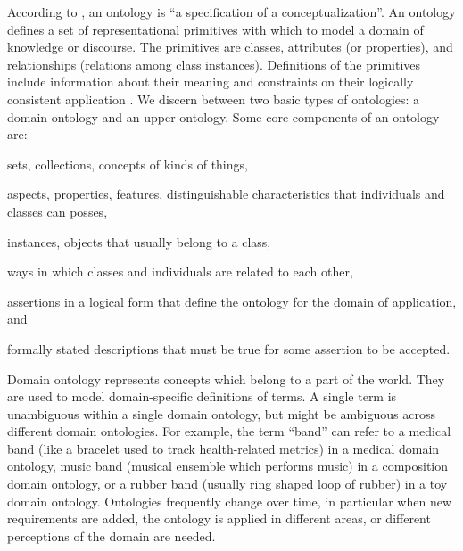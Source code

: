 According to \citep{gruber2009ontology}, 
an ontology is ``a specification of a conceptualization''.
An ontology defines a set of representational primitives with which to model 
a domain of knowledge or discourse. The primitives are classes, attributes
(or properties), and relationships (relations among class instances). 
Definitions of the primitives include information about their
meaning and constraints on their logically consistent application
\citep{gruber2009ontology}.
We discern between two basic types of ontologies: a domain ontology and an
upper ontology.
Some core components of an ontology are:
\begin{description}[leftmargin=!,labelwidth=\widthof{\bfseries Restrictions}]
\item[Classes] sets, collections, concepts of kinds of things,
\item[Attributes] aspects, properties, features, distinguishable characteristics that
	individuals and classes can posses,
\item[Individuals] instances, objects that usually belong to a class,
\item[Relations] ways in which classes and individuals are related to each other,
\item[Axioms] assertions in a logical form that define the ontology for the domain of application, and
\item[Restrictions] formally stated descriptions that must be true for some assertion to be accepted. 
\end{description}

Domain ontology represents concepts which belong to a part of the world. 
They are used to model domain-specific definitions of terms. A single term is
unambiguous within a single domain ontology, but might be ambiguous across
different domain ontologies. For example, the term ``band'' can refer to a
medical band (like a bracelet used to track health-related metrics) in a
medical domain ontology, music band (musical ensemble which performs music) in
a composition domain ontology, or a rubber band (usually ring shaped loop of
rubber) in a toy domain ontology. Ontologies frequently change over time, 
in particular when new requirements are added, 
the ontology is applied in different areas, or different 
perceptions of the domain are needed.

